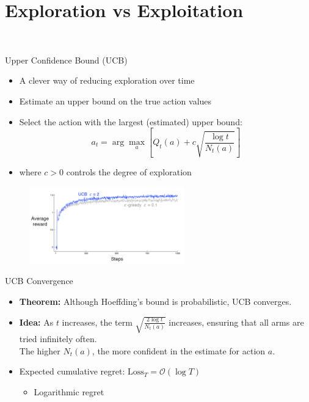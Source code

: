 \documentclass[11pt,table]{beamer}
\begin{document}
\section{Exploration vs Exploitation}
{
\begin{frame}
\centering
\Huge
\textcolor{white}{Exploration vs Exploitation}
\thispagestyle{empty}
\end{frame}
}

\begin{frame}{Upper Confidence Bound (UCB)}
    \begin{itemize}
        \item A clever way of reducing exploration over time
        \item Estimate an upper bound on the true action values
        \item Select the action with the largest (estimated) upper bound:
        \[
            a_t = \arg\max_a \left[ Q_t(a) + c \sqrt{\frac{\log t}{N_t(a)}} \right]
        \]
        \item where $c > 0$ controls the degree of exploration
    \end{itemize}
						\begin{figure}
					\centering
						\includegraphics[width=0.60\textwidth]{figures/average reward}
					\label{fig:BOLS}
				\end{figure}
				
\end{frame}




\begin{frame}{UCB Convergence}


    \begin{itemize}
        \item  \textbf{Theorem:} Although Hoeffding's bound is probabilistic, \textcolor{red1}{UCB converges}.

\item  \textbf{Idea:} As $t$ increases, the term $\sqrt{\frac{2 \log t}{N_t(a)}}$ increases, ensuring that all arms are tried infinitely often.\\
The higher $N_t(a)$, the more confident in the estimate for action $a$.

\item  Expected cumulative regret: $\text{Loss}_{T}=\mathcal{O}(\log T)$
\begin{itemize}
    \item \textcolor{red1}{Logarithmic regret} 
    \end{itemize}
    \end{itemize}
\end{frame}
\end{document}
